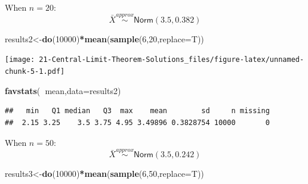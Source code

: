 \documentclass[
]{book}
\newenvironment{Shaded}{\begin{snugshade}}{\end{snugshade}}
\newcommand{\DataTypeTok}[1]{\textcolor[rgb]{0.13,0.29,0.53}{#1}}
\newcommand{\DecValTok}[1]{\textcolor[rgb]{0.00,0.00,0.81}{#1}}
\newcommand{\KeywordTok}[1]{\textcolor[rgb]{0.13,0.29,0.53}{\textbf{#1}}}
\newcommand{\NormalTok}[1]{#1}
\newcommand{\OperatorTok}[1]{\textcolor[rgb]{0.81,0.36,0.00}{\textbf{#1}}}
\newcommand{\StringTok}[1]{\textcolor[rgb]{0.31,0.60,0.02}{#1}}
\begin{document}
When \(n=20\):
\[
\bar{X}\overset{approx}{\sim}\textsf{Norm}(3.5,0.382)
\]

\begin{Shaded}
\begin{Highlighting}[]
\NormalTok{results2<-}\KeywordTok{do}\NormalTok{(}\DecValTok{10000}\NormalTok{)}\OperatorTok{*}\KeywordTok{mean}\NormalTok{(}\KeywordTok{sample}\NormalTok{(}\DecValTok{6}\NormalTok{,}\DecValTok{20}\NormalTok{,}\DataTypeTok{replace=}\NormalTok{T))}
\end{Highlighting}
\end{Shaded}

\begin{Shaded}
\end{Shaded}

\texttt{[image: 21-Central-Limit-Theorem-Solutions\_files/figure-latex/unnamed-chunk-5-1.pdf]}

\begin{Shaded}
\begin{Highlighting}[]
\KeywordTok{favstats}\NormalTok{(}\OperatorTok{~}\NormalTok{mean,}\DataTypeTok{data=}\NormalTok{results2)}
\end{Highlighting}
\end{Shaded}

\begin{verbatim}
##   min   Q1 median   Q3  max    mean        sd     n missing
##  2.15 3.25    3.5 3.75 4.95 3.49896 0.3828754 10000       0
\end{verbatim}

When \(n=50\):
\[
\bar{X}\overset{approx}{\sim}\textsf{Norm}(3.5,0.242)
\]

\begin{Shaded}
\begin{Highlighting}[]
\NormalTok{results3<-}\KeywordTok{do}\NormalTok{(}\DecValTok{10000}\NormalTok{)}\OperatorTok{*}\KeywordTok{mean}\NormalTok{(}\KeywordTok{sample}\NormalTok{(}\DecValTok{6}\NormalTok{,}\DecValTok{50}\NormalTok{,}\DataTypeTok{replace=}\NormalTok{T))}
\end{Highlighting}
\end{Shaded}
\end{document}
